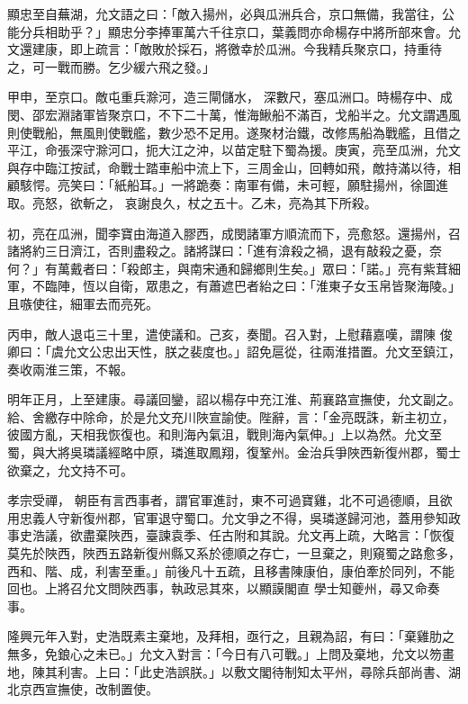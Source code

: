 \begin{pinyinscope}
 顯忠至自蕪湖，允文語之曰：「敵入揚州，必與瓜洲兵合，京口無備，我當往，公能分兵相助乎？」顯忠分李捧軍萬六千往京口，葉義問亦命楊存中將所部來會。允文還建康，即上疏言：「敵敗於採石，將徼幸於瓜洲。今我精兵聚京口，持重待之，可一戰而勝。乞少緩六飛之發。」



 甲申，至京口。敵屯重兵滁河，造三閘儲水，
 深數尺，塞瓜洲口。時楊存中、成閔、邵宏淵諸軍皆聚京口，不下二十萬，惟海鰍船不滿百，戈船半之。允文謂遇風則使戰船，無風則使戰艦，數少恐不足用。遂聚材治鐵，改修馬船為戰艦，且借之平江，命張深守滁河口，扼大江之沖，以苗定駐下蜀為援。庚寅，亮至瓜洲，允文與存中臨江按試，命戰士踏車船中流上下，三周金山，回轉如飛，敵持滿以待，相顧駭愕。亮笑曰：「紙船耳。」一將跪奏：南軍有備，未可輕，願駐揚州，徐圖進取。亮怒，欲斬之，
 哀謝良久，杖之五十。乙未，亮為其下所殺。



 初，亮在瓜洲，聞李寶由海道入膠西，成閔諸軍方順流而下，亮愈怒。還揚州，召諸將約三日濟江，否則盡殺之。諸將謀曰：「進有渰殺之禍，退有敲殺之憂，奈何？」有萬戴者曰：「殺郎主，與南宋通和歸鄉則生矣。」眾曰：「諾。」亮有紫茸細軍，不臨陣，恆以自衛，眾患之，有蕭遮巴者紿之曰：「淮東子女玉帛皆聚海陵。」且嗾使往，細軍去而亮死。



 丙申，敵人退屯三十里，遣使議和。己亥，奏聞。召入對，上慰藉嘉嘆，謂陳
 俊卿曰：「虞允文公忠出天性，朕之裴度也。」詔免扈從，往兩淮措置。允文至鎮江，奏收兩淮三策，不報。



 明年正月，上至建康。尋議回鑾，詔以楊存中充江淮、荊襄路宣撫使，允文副之。給、舍繳存中除命，於是允文充川陜宣諭使。陛辭，言：「金亮既誅，新主初立，彼國方亂，天相我恢復也。和則海內氣沮，戰則海內氣伸。」上以為然。允文至蜀，與大將吳璘議經略中原，璘進取鳳翔，復鞏州。金治兵爭陜西新復州郡，蜀士欲棄之，允文持不可。



 孝宗受禪，
 朝臣有言西事者，謂官軍進討，東不可過寶雞，北不可過德順，且欲用忠義人守新復州郡，官軍退守蜀口。允文爭之不得，吳璘遂歸河池，蓋用參知政事史浩議，欲盡棄陜西，臺諫袁季、任古附和其說。允文再上疏，大略言：「恢復莫先於陜西，陜西五路新復州縣又系於德順之存亡，一旦棄之，則窺蜀之路愈多，西和、階、成，利害至重。」前後凡十五疏，且移書陳康伯，康伯牽於同列，不能回也。上將召允文問陜西事，執政忌其來，以顯謨閣直
 學士知夔州，尋又命奏事。



 隆興元年入對，史浩既素主棄地，及拜相，亟行之，且親為詔，有曰：「棄雞肋之無多，免鋃心之未已。」允文入對言：「今日有八可戰。」上問及棄地，允文以笏畫地，陳其利害。上曰：「此史浩誤朕。」以敷文閣待制知太平州，尋除兵部尚書、湖北京西宣撫使，改制置使。




\end{pinyinscope}
